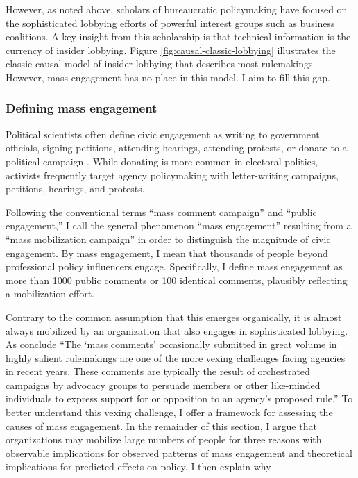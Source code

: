 However, as noted above, scholars of bureaucratic policymaking have focused on the sophisticated lobbying efforts of powerful interest groups such as business coalitions. A key insight from this scholarship is that technical information is the currency of insider lobbying. Figure \ref{fig:causal-classic-lobbying} illustrates the classic causal model of insider lobbying that describes most rulemakings. However, mass engagement has no place in this model. I aim to fill this gap.






\subsubsection{Defining mass engagement}
Political scientists often define civic engagement as writing to government officials, signing petitions, attending hearings, attending protests, or donate to a political campaign \citep{Verba1984}. While donating is more common in electoral politics, activists frequently target agency policymaking with letter-writing campaigns, petitions, hearings, and protests. 

Following the conventional terms ``mass comment campaign'' and ``public engagement,'' I call the general phenomenon ``mass engagement'' resulting from a ``mass mobilization campaign'' in order to distinguish the magnitude of civic engagement.
By mass engagement, I mean that thousands of people beyond professional policy influencers engage. Specifically, I define mass engagement as more than 1000 public comments or 100 identical comments, plausibly reflecting a mobilization effort.  

Contrary to the common assumption that this emerges organically, it is almost always mobilized by an organization that also engages in sophisticated lobbying. %
As \citet{SantAmbrogio2018} conclude ``The `mass comments' occasionally submitted in great volume in highly salient
rulemakings are one of the more vexing challenges facing agencies in recent years. These comments are typically the result of orchestrated campaigns by advocacy groups to persuade members or other like-minded individuals to express support for or opposition to an agency's proposed rule.'' %
To better understand this vexing challenge, I offer a framework for assessing the causes of mass engagement. In the remainder of this section, I argue that organizations may mobilize large numbers of people for three reasons with observable implications for observed patterns of mass engagement and theoretical implications for predicted effects on policy. I then explain why 

